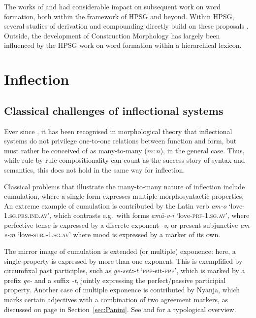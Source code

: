 \documentclass[output=paper
 	        ,biblatex
                ,babelshorthands
                ,newtxmath
                ,draftmode
                ,colorlinks, citecolor=brown
]{langscibook}
\begin{document}
The works of \citet{Riehemann98} and \cite{Koenig99} had considerable
impact on subsequent work on word formation, both within the framework 
of HPSG and beyond. Within HPSG, several studies of  derivation
and compounding directly build on these proposals \citep[e.g.][]{Tribout10,Desmets09}. 
Outside, the development of Construction Morphology
\citep{Booij10} has largely been influenced by the HPSG work on word
formation within a hierarchical lexicon. 

\section{Inflection}
\label{sec:Infl}\label{sec:inflection}

\subsection{Classical challenges of inflectional systems}
\label{sec:InflChallenges}

Ever since \citet{Matthews72}, it has been recognised in morphological
theory that inflectional systems do not privilege one-to-one relations
between function and form, but must rather be conceived of as
many-to-many ($m:n$), in the general case. Thus, while
rule-by-rule compositionality can count as the success story
of syntax and semantics, this does not hold in the same way for inflection. 

Classical problems that illustrate the many-to-many nature of
inflection include cumulation, where a single form expresses multiple
morphosyntactic properties. An extreme example of cumulation is
contributed by the Latin verb \textit{am-o}
`love-1.\textsc{sg}.\textsc{prs}.\textsc{ind}.\textsc{av}', which
contrasts e.g.\ with forms \textit{amā-v-i}
`love-\textsc{prf}-\textsc{1.sg.av}', where perfective tense is
expressed by a discrete exponent \textit{-v}, or present subjunctive
\textit{am-ē-m} `love-\textsc{subj}-\textsc{1.sg.av}' where mood is
expressed by a marker of its own.

The mirror image of cumulation is extended (or multiple) exponence:
here, a single property is expressed by more than one exponent. This
is exemplified by  circumfixal past participles, such as
\textit{ge-setz-t} `\textsc{ppp}-sit-\textsc{ppp}', which is
 marked by a prefix \textit{ge-} and a suffix \textit{-t},
jointly expressing the perfect/passive participial property. Another
case of multiple exponence is contributed by Nyanja, which marks
certain adjectives with a combination of two agreement markers, as
discussed on page \pageref{Nyanja} in
Section~\ref{sec:Panini}.  See
\citet{caballero_g-harris_a12} and \citet{Harris17} for a typological overview. 
\end{document}
